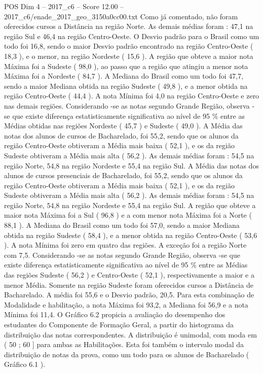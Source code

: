 \begin{textsample}{POS Dim 4 – 2017\_c6 – Score 12.00 – 2017\_c6/enade\_2017\_geo\_3150a0cc00.txt}
Como já comentado, não foram oferecidos cursos a Distância na região Norte.
As demais médias foram : 47,1 na região Sul e 46,4 na região Centro-Oeste.
O Desvio padrão para o Brasil como um todo foi 16,8, sendo o maior Desvio padrão encontrado na região Centro-Oeste ( 18,3 ), e o menor, na região Nordeste ( 15,6 ).
A região que obteve a maior nota Máxima foi a Sudeste ( 98,0 ), ao passo que a região que atingiu a menor nota Máxima foi a Nordeste ( 84,7 ).
A Mediana do Brasil como um todo foi 47,7, sendo a maior Mediana obtida na região Sudeste ( 49,8 ), e a menor obtida na região Centro-Oeste ( 44,4 ).
A nota Mínima foi 4,0 na região Centro-Oeste e zero nas demais regiões.
Considerando -se as notas segundo Grande Região, observa -se que existe diferença estatisticamente significativa ao nível de 95 \% entre as Médias obtidas nas regiões Nordeste ( 45,7 ) e Sudeste ( 49,0 ).
A Média das notas dos alunos de cursos de Bacharelado, foi 55,2, sendo que os alunos da região Centro-Oeste obtiveram a Média mais baixa ( 52,1 ), e os da região Sudeste obtiveram a Média mais alta ( 56,2 ).
As demais médias foram : 54,5 na região Norte, 54,8 na região Nordeste e 55,4 na região Sul.
A Média das notas dos alunos de cursos presenciais de Bacharelado, foi 55,2, sendo que os alunos da região Centro-Oeste obtiveram a Média mais baixa ( 52,1 ), e os da região Sudeste obtiveram a Média mais alta ( 56,2 ).
As demais médias foram : 54,5 na região Norte, 54,8 na região Nordeste e 55,4 na região Sul.
A região que obteve a maior nota Máxima foi a Sul ( 96,8 ) e a com menor nota Máxima foi a Norte ( 88,1 ).
A Mediana do Brasil como um todo foi 57,0, sendo a maior Mediana obtida na região Sudeste ( 58,4 ), e a menor obtida na região Centro-Oeste ( 53,6 ).
A nota Mínima foi zero em quatro das regiões.
A exceção foi a região Norte com 7,5.
Considerando -se as notas segundo Grande Região, observa -se que existe diferença estatisticamente significativa ao nível de 95 \% entre as Médias das regiões Sudeste ( 56,2 ) e Centro-Oeste ( 52,1 ), respectivamente a maior e a menor Média.
Somente na região Sudeste foram oferecidos cursos a Distância de Bacharelado.
A média foi 55,6 e o Desvio padrão, 20,5.
Para esta combinação de Modalidade e habilitação, a nota Máxima foi 93,2, a Mediana foi 56,9 e a nota Mínima foi 11,4.
O Gráfico 6.2 propicia a avaliação do desempenho dos estudantes do Componente de Formação Geral, a partir do histograma da distribuição das notas correspondentes.
A distribuição é unimodal, com moda em ( 50 ; 60 ] para ambas as Habilitações.
Esta foi também o intervalo modal da distribuição de notas da prova, como um todo para os alunos de Bacharelado ( Gráfico 6.1 ).

\end{textsample}
